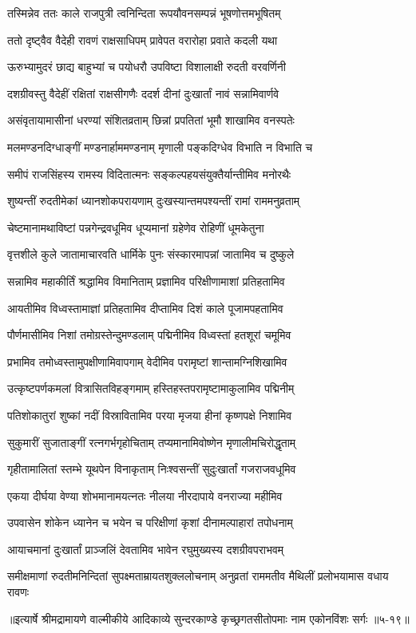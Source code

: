 
\twolineshloka
{तस्मिन्नेव ततः काले राजपुत्री त्वनिन्दिता}
{रूपयौवनसम्पन्नं भूषणोत्तमभूषितम्} %

\twolineshloka
{ततो दृष्ट्वैव वैदेही रावणं राक्षसाधिपम्}
{प्रावेपत वरारोहा प्रवाते कदली यथा} %

\twolineshloka
{ऊरुभ्यामुदरं छाद्य बाहुभ्यां च पयोधरौ}
{उपविष्टा विशालाक्षी रुदती वरवर्णिनी} %

\twolineshloka
{दशग्रीवस्तु वैदेहीं रक्षितां राक्षसीगणैः}
{ददर्श दीनां दुःखार्तां नावं सन्नामिवार्णवे} %

\twolineshloka
{असंवृतायामासीनां धरण्यां संशितव्रताम्}
{छिन्नां प्रपतितां भूमौ शाखामिव वनस्पतेः} %

\twolineshloka
{मलमण्डनदिग्धाङ्गीं मण्डनार्हाममण्डनाम्}
{मृणाली पङ्कदिग्धेव विभाति न विभाति च} %

\twolineshloka
{समीपं राजसिंहस्य रामस्य विदितात्मनः}
{सङ्कल्पहयसंयुक्तैर्यान्तीमिव मनोरथैः} %

\twolineshloka
{शुष्यन्तीं रुदतीमेकां ध्यानशोकपरायणाम्}
{दुःखस्यान्तमपश्यन्तीं रामां राममनुव्रताम्} %

\twolineshloka
{चेष्टमानामथाविष्टां पन्नगेन्द्रवधूमिव}
{धूप्यमानां ग्रहेणेव रोहिणीं धूमकेतुना} %

\twolineshloka
{वृत्तशीले कुले जातामाचारवति धार्मिके}
{पुनः संस्कारमापन्नां जातामिव च दुष्कुले} %

\twolineshloka
{सन्नामिव महाकीर्तिं श्रद्धामिव विमानिताम्}
{प्रज्ञामिव परिक्षीणामाशां प्रतिहतामिव} %

\twolineshloka
{आयतीमिव विध्वस्तामाज्ञां प्रतिहतामिव}
{दीप्तामिव दिशं काले पूजामपहतामिव} %

\twolineshloka
{पौर्णमासीमिव निशां तमोग्रस्तेन्दुमण्डलाम्}
{पद्मिनीमिव विध्वस्तां हतशूरां चमूमिव} %

\twolineshloka
{प्रभामिव तमोध्वस्तामुपक्षीणामिवापगाम्}
{वेदीमिव परामृष्टां शान्तामग्निशिखामिव} %

\twolineshloka
{उत्कृष्टपर्णकमलां वित्रासितविहङ्गमाम्}
{हस्तिहस्तपरामृष्टामाकुलामिव पद्मिनीम्} %

\twolineshloka
{पतिशोकातुरां शुष्कां नदीं विस्रावितामिव}
{परया मृजया हीनां कृष्णपक्षे निशामिव} %

\twolineshloka
{सुकुमारीं सुजाताङ्गीं रत्नगर्भगृहोचिताम्}
{तप्यमानामिवोष्णेन मृणालीमचिरोद्धृताम्} %

\twolineshloka
{गृहीतामालितां स्तम्भे यूथपेन विनाकृताम्}
{निःश्वसन्तीं सुदुःखार्तां गजराजवधूमिव} %

\twolineshloka
{एकया दीर्घया वेण्या शोभमानामयत्नतः}
{नीलया नीरदापाये वनराज्या महीमिव} %

\twolineshloka
{उपवासेन शोकेन ध्यानेन च भयेन च}
{परिक्षीणां कृशां दीनामल्पाहारां तपोधनाम्} %

\twolineshloka
{आयाचमानां दुःखार्तां प्राञ्जलिं देवतामिव}
{भावेन रघुमुख्यस्य दशग्रीवपराभवम्} %

\twolineshloka
{समीक्षमाणां रुदतीमनिन्दितां सुपक्ष्मताम्रायतशुक्ललोचनाम्}
{अनुव्रतां राममतीव मैथिलीं प्रलोभयामास वधाय रावणः} %


॥इत्यार्षे श्रीमद्रामायणे वाल्मीकीये आदिकाव्ये सुन्दरकाण्डे कृच्छ्रगतसीतोपमाः नाम एकोनविंशः सर्गः ॥५-१९॥
